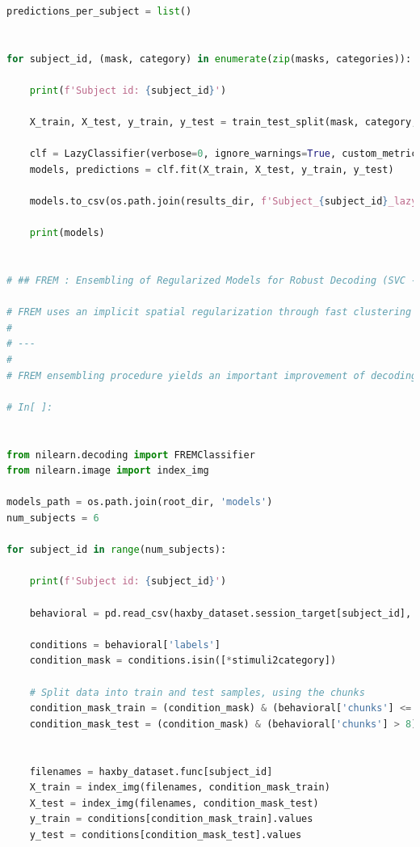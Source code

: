 \documentclass[10pt, twocolumn, letterpaper]{article}
\begin{document}
\begin{lstlisting}[language=Python]
predictions_per_subject = list()


for subject_id, (mask, category) in enumerate(zip(masks, categories)):
    
    print(f'Subject id: {subject_id}')
  
    X_train, X_test, y_train, y_test = train_test_split(mask, category, test_size=0.3, random_state=42)
    
    clf = LazyClassifier(verbose=0, ignore_warnings=True, custom_metric=None)
    models, predictions = clf.fit(X_train, X_test, y_train, y_test)    
    
    models.to_csv(os.path.join(results_dir, f'Subject_{subject_id}_lazy_results.csv'))

    print(models)


# ## FREM : Ensembling of Regularized Models for Robust Decoding (SVC - L2)

# FREM uses an implicit spatial regularization through fast clustering and aggregates a high number of estimators trained on various splits of the training set, thus returning a very robust decoder at a lower computational cost than other spatially regularized methods
# 
# ---
# 
# FREM ensembling procedure yields an important improvement of decoding accuracy on this simple example compared to fitting only one model per fold and the clustering mechanism keeps its computational cost reasonable even on heavier examples. Here we ensembled several instances of l2-SVC, but FREMClassifier also works with ridge or logistic. 

# In[ ]:


from nilearn.decoding import FREMClassifier
from nilearn.image import index_img
    
models_path = os.path.join(root_dir, 'models')
num_subjects = 6

for subject_id in range(num_subjects):
    
    print(f'Subject id: {subject_id}')

    behavioral = pd.read_csv(haxby_dataset.session_target[subject_id], sep=" ")

    conditions = behavioral['labels']
    condition_mask = conditions.isin([*stimuli2category])

    # Split data into train and test samples, using the chunks
    condition_mask_train = (condition_mask) & (behavioral['chunks'] <= 8)
    condition_mask_test = (condition_mask) & (behavioral['chunks'] > 8)
   
   
    filenames = haxby_dataset.func[subject_id]
    X_train = index_img(filenames, condition_mask_train)
    X_test = index_img(filenames, condition_mask_test)
    y_train = conditions[condition_mask_train].values
    y_test = conditions[condition_mask_test].values    
    

\end{lstlisting}
\end{document}
